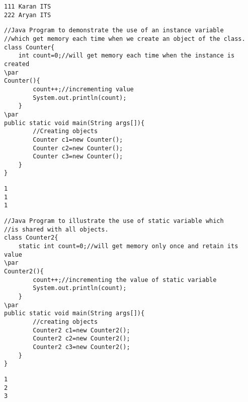 \documentclass{book}
\def\lthtmlcheckvsize{\ifdim\ht\sizebox<\vsize 
  \ifdim\wd\sizebox<\hsize\expandafter\hfill\fi \expandafter\vfill
  \else\expandafter\vss\fi}%
\begin{document}
{\newpage\clearpage
{}%
\begin{lstlisting}
111 Karan ITS
222 Aryan ITS
\end{lstlisting}%
\lthtmlfigureZ
\lthtmlcheckvsize\clearpage}

{\newpage\clearpage
{}%
\begin{lstlisting}
//Java Program to demonstrate the use of an instance variable  
//which get memory each time when we create an object of the class.  
class Counter{  
	int count=0;//will get memory each time when the instance is created  
\par
Counter(){  
		count++;//incrementing value  
		System.out.println(count);  
	}  
\par
public static void main(String args[]){  
		//Creating objects  
		Counter c1=new Counter();  
		Counter c2=new Counter();  
		Counter c3=new Counter();  
	}  
}  
\end{lstlisting}%
\lthtmlfigureZ
\lthtmlcheckvsize\clearpage}

{\newpage\clearpage
{}%
\begin{lstlisting}
1
1
1
\end{lstlisting}%
\lthtmlfigureZ
\lthtmlcheckvsize\clearpage}

{\newpage\clearpage
{}%
\begin{lstlisting}
//Java Program to illustrate the use of static variable which  
//is shared with all objects.  
class Counter2{  
	static int count=0;//will get memory only once and retain its value  
\par
Counter2(){  
		count++;//incrementing the value of static variable  
		System.out.println(count);  
	}  
\par
public static void main(String args[]){  
		//creating objects  
		Counter2 c1=new Counter2();  
		Counter2 c2=new Counter2();  
		Counter2 c3=new Counter2();  
	}  
}
\end{lstlisting}%
\lthtmlfigureZ
\lthtmlcheckvsize\clearpage}

{\newpage\clearpage
{}%
\begin{lstlisting}
1
2
3
\end{lstlisting}%
\lthtmlfigureZ
\lthtmlcheckvsize\clearpage}
\end{document}
